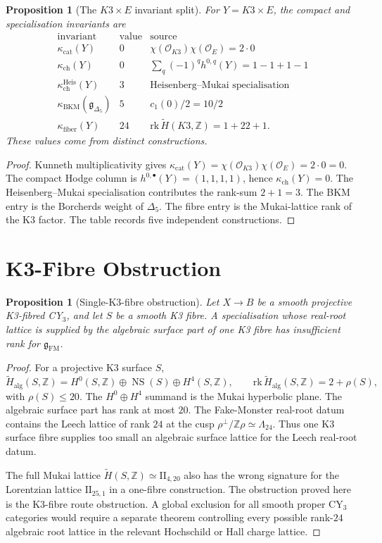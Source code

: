 \documentclass[11pt]{amsart}
\newtheorem{proposition}[theorem]{Proposition}
\theoremstyle{definition}
\theoremstyle{remark}
\providecommand{\Z}{\mathbb{Z}}
\providecommand{\cO}{\mathcal{O}}
\providecommand{\Leech}{\Lambda_{24}}
\providecommand{\IIlor}{\mathrm{II}_{25,1}}
\providecommand{\gFM}{\mathfrak{g}_{\mathrm{FM}}}
\providecommand{\gDelta}{\mathfrak{g}_{\Delta_5}}
\providecommand{\kBKM}{\kappa_{\mathrm{BKM}}}
\providecommand{\kch}{\kappa_{\mathrm{ch}}}
\providecommand{\kcat}{\kappa_{\mathrm{cat}}}
\providecommand{\kfib}{\kappa_{\mathrm{fiber}}}
\providecommand{\kHeis}{\kappa_{\mathrm{ch}}^{\mathrm{Heis}}}
\providecommand{\rk}{\mathrm{rk}}
\begin{document}
\begin{proposition}[The \(K3\times E\) invariant split]
\label{prop:k3xe-invariant-split}
For \(Y=K3\times E\), the compact and specialisation invariants are
\[
\begin{array}{c|c|l}
\text{invariant} & \text{value} & \text{source}\\
\hline
\kcat(Y) & 0 &
\chi(\cO_{K3})\chi(\cO_E)=2\cdot0\\
\kch(Y) & 0 &
\sum_q(-1)^q h^{0,q}(Y)=1-1+1-1\\
\kHeis(Y) & 3 &
\text{Heisenberg--Mukai specialisation}\\
\kBKM(\gDelta) & 5 &
c_1(0)/2=10/2\\
\kfib(Y) & 24 &
\rk\,\widetilde H(K3,\Z)=1+22+1 .
\end{array}
\]
These values come from distinct constructions.
\end{proposition}

\begin{proof}
Kunneth multiplicativity gives
\(\kcat(Y)=\chi(\cO_{K3})\chi(\cO_E)=2\cdot0=0\). The compact Hodge
column is \(h^{0,\bullet}(Y)=(1,1,1,1)\), hence
\(\kch(Y)=0\). The Heisenberg--Mukai specialisation contributes the
rank-sum \(2+1=3\). The BKM entry is the Borcherds weight of
\(\Delta_5\). The fibre entry is the Mukai-lattice rank of the K3
factor. The table records five independent constructions.
\end{proof}

\section{K3-Fibre Obstruction}

\begin{proposition}[Single-K3-fibre obstruction]
\label{prop:single-k3-fibre-obstruction}
Let \(X\to B\) be a smooth projective K3-fibred CY\(_3\), and let
\(S\) be a smooth K3 fibre. A specialisation whose real-root lattice is
supplied by the algebraic surface part of one K3 fibre has insufficient
rank for \(\gFM\).
\end{proposition}

\begin{proof}
For a projective K3 surface \(S\),
\[
 \widetilde H_{\mathrm{alg}}(S,\Z)
 =
 H^0(S,\Z)\oplus \operatorname{NS}(S)\oplus H^4(S,\Z),
\qquad
\rk\,\widetilde H_{\mathrm{alg}}(S,\Z)=2+\rho(S),
\]
with \(\rho(S)\leq20\). The \(H^0\oplus H^4\) summand is the Mukai
hyperbolic plane. The algebraic surface part has rank at most \(20\).
The Fake-Monster real-root datum contains the Leech lattice of rank
\(24\) at the cusp \(\rho^\perp/\Z\rho\simeq\Leech\). Thus one K3
surface fibre supplies too small an algebraic surface lattice for the
Leech real-root datum.

The full Mukai lattice \(\widetilde H(S,\Z)\simeq \mathrm{II}_{4,20}\)
also has the wrong signature for the Lorentzian lattice \(\IIlor\) in a
one-fibre construction. The obstruction proved here is the K3-fibre
route obstruction. A global exclusion for all smooth proper CY\(_3\)
categories would require a separate theorem controlling every possible
rank-\(24\) algebraic root lattice in the relevant Hochschild or Hall
charge lattice.
\end{proof}
\end{document}
